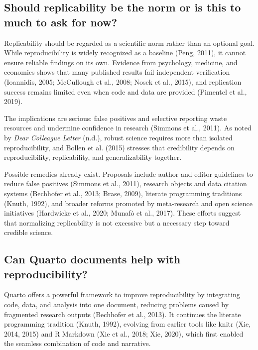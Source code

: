 \documentclass[
  a4paper,
]{article}
\begin{document}
\subsection{Should replicability be the norm or is this to much to ask
for
now?}\label{should-replicability-be-the-norm-or-is-this-to-much-to-ask-for-now}

Replicability should be regarded as a scientific norm rather than an
optional goal. While reproducibility is widely recognized as a baseline
(Peng, 2011), it cannot ensure reliable findings on its own. Evidence
from psychology, medicine, and economics shows that many published
results fail independent verification (Ioannidis, 2005; McCullough et
al., 2008; Nosek et al., 2015), and replication success remains limited
even when code and data are provided (Pimentel et al., 2019).

The implications are serious: false positives and selective reporting
waste resources and undermine confidence in research (Simmons et al.,
2011). As noted by \emph{Dear {Colleague Letter}} (n.d.), robust science
requires more than isolated reproducibility, and Bollen et al. (2015)
stresses that credibility depends on reproducibility, replicability, and
generalizability together.

Possible remedies already exist. Proposals include author and editor
guidelines to reduce false positives (Simmons et al., 2011), research
objects and data citation systems (Bechhofer et al., 2013; Brase, 2009),
literate programming traditions (Knuth, 1992), and broader reforms
promoted by meta-research and open science initiatives (Hardwicke et
al., 2020; Munafò et al., 2017). These efforts suggest that normalizing
replicability is not excessive but a necessary step toward credible
science.

\subsection{Can Quarto documents help with
reproducibility?}\label{can-quarto-documents-help-with-reproducibility}

Quarto offers a powerful framework to improve reproducibility by
integrating code, data, and analysis into one document, reducing
problems caused by fragmented research outputs (Bechhofer et al., 2013).
It continues the literate programming tradition (Knuth, 1992), evolving
from earlier tools like knitr (Xie, 2014, 2015) and R Markdown (Xie et
al., 2018; Xie, 2020), which first enabled the seamless combination of
code and narrative.
\end{document}
